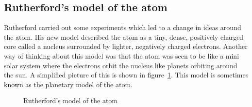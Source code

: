             \subsection*{Rutherford's model of the atom}
            \nopagebreak
\begin{minipage}{.5\textwidth}
            \label{m38756*id254751}Rutherford carried out some experiments which led to a change in ideas around the atom. His new model described the atom as a tiny, dense, positively charged core called a nucleus surrounded by lighter, negatively charged electrons. Another way of thinking about this model was that the atom was seen to be like a mini solar system where the electrons orbit the nucleus like planets orbiting around the sun. A simplified picture of this is shown in figure~\ref{rutherfordmodel}. This model is sometimes known as the planetary model of the atom.\par 
\end{minipage}
\begin{minipage}{.5\textwidth}
	\begin{figure}[H] %
    \begin{center}
\caption{Rutherford's model of the atom}
\end{center}
\label{rutherfordmodel}
 \end{figure} 
\end{minipage}      
      \label{m38756*uid6}
